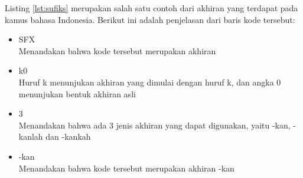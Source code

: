 \begin{enumerate}
	 Listing \ref{lst:sufiks} merupakan salah satu contoh dari akhiran yang terdapat pada kamus bahasa Indonesia. Berikut ini adalah penjelasan dari baris kode tersebut:
	
	\begin{itemize}
		\item SFX\\
		Menandakan bahwa kode tersebut merupakan akhiran
		
		\item k0\\
		Huruf k menunjukan akhiran yang dimulai dengan huruf k, dan angka 0 menunjukan bentuk akhiran asli
		
		\item 3\\
		Menandakan bahwa ada 3 jenis akhiran yang dapat digunakan, yaitu -kan, -kanlah dan -kankah
		
		\item -kan\\
		Menandakan bahwa kode tersebut merupakan akhiran -kan 
	\end{itemize}
	
\end{enumerate}